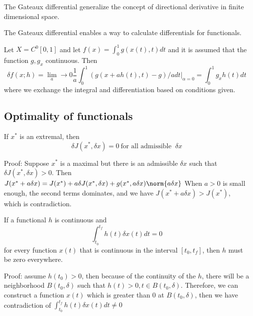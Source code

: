 \begin{refsection}
\begin{remark}
The Gateaux differential generalize the concept of directional derivative in finite dimensional space.
\end{remark}

\begin{remark}
The Gateaux differential enables a way to calculate differentials for functionals.
\end{remark}

\begin{example}
Let $X = C^0[0,1]$ and let $f(x) = \int_0^1 g(x(t),t)dt$ and it is assumed that the function $g, g_x$ continuous. Then
$$\delta f(x;h) = \lim_a\to 0 \frac{1}{a} \int_0^1 (g(x + ah(t),t) - g) / a dt|_{\alpha = 0}  = \int_0^1 g_x h(t) dt$$
where we exchange the integral and differentiation based on conditions given.
\end{example}


\subsection{Optimality of functionals}
\begin{theorem}
\cite[121]{kirk2012optimal}
If $x^*$ is an extremal, then $$\delta J(x^*,\delta x) = 0 ~\text{for all admissible } ~\delta x$$
\end{theorem}
Proof: Suppose $x^*$ is a maximal but there is an admissible $\delta x$ such that $\delta J(x^*,\delta x) > 0 $. Then $J(x^*+a\delta x) = J(x^*) + a\delta J(x^*,\delta x) + g(x^*,a \delta x)\norm{a\delta x}$
When $a>0$ is small enough, the second terms dominates, and we have $J(x^*+a\delta x) > J(x^*)$, which is contradiction. 


\begin{lemma}\label{ch:calculus-of-variations:th:fundamentallemmaofcalculusofvariations}
\cite[126]{kirk2012optimal}If a functional $h$ is continuous and 
$$\int_{t_0}^{t_f} h(t)\delta x(t) dt = 0$$
for every function $x(t)$ that is continuous in the interval $[t_0,t_f]$, then $h$ must be zero everywhere.
\end{lemma}
Proof: assume $h(t_0) > 0$, then because of the continuity of the $h$, there will be a neighborhood $B(t_0,\delta)$ such that $h(t)>0,t\in B(t_0,\delta)$. Therefore, we can construct a function $x(t)$ which is greater than 0 at $B(t_0,\delta)$, then we have contradiction of $\int_{t_0}^{t_f} h(t)\delta x(t) dt \neq 0$



\end{refsection}
